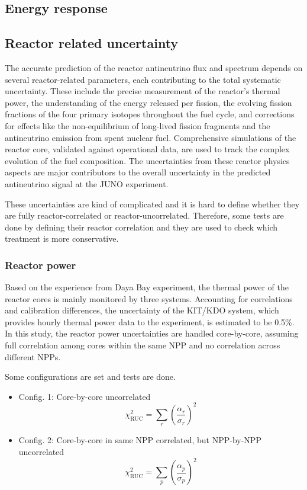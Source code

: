 \subsection{Energy response}
 

\subsection{Reactor related uncertainty}
The accurate prediction of the reactor antineutrino flux and spectrum depends on several reactor-related parameters, each contributing to the total systematic uncertainty. These include the precise measurement of the reactor's thermal power, the understanding of the energy released per fission, the evolving fission fractions of the four primary isotopes throughout the fuel cycle, and corrections for effects like the non-equilibrium of long-lived fission fragments and the antineutrino emission from spent nuclear fuel. Comprehensive simulations of the reactor core, validated against operational data, are used to track the complex evolution of the fuel composition. The uncertainties from these reactor physics aspects are major contributors to the overall uncertainty in the predicted antineutrino signal at the JUNO experiment.

These uncertainties are kind of complicated and it is hard to define whether they are fully reactor-correlated or reactor-uncorrelated. 
Therefore, some tests are done by defining their reactor correlation and they are used to check which treatment is more conservative. 

\subsubsection{Reactor power}
Based on the experience from Daya Bay experiment, the thermal power of the reactor cores is mainly monitored by three systems. Accounting for correlations and calibration differences, the uncertainty of the KIT/KDO system, which provides hourly thermal power data to the experiment, is estimated to be 0.5\%. 
In this study, the reactor power uncertainties are handled core-by-core, assuming full correlation among cores within the same NPP and no correlation across different NPPs.

Some configurations are set and tests are done. 
\begin{itemize}
        \item Config. 1: Core-by-core uncorrelated 
        \[
        \chi^2_{\text{RUC}} = \sum_{r} \left( \frac{\alpha_r}{\sigma_r} \right)^2
        \]
        \item Config. 2: Core-by-core in same NPP correlated, but NPP-by-NPP uncorrelated 
        \[
        \chi^2_{\text{RUC}} = \sum_{p} \left( \frac{\alpha_p}{\sigma_p} \right)^2 
        \]
    \end{itemize}
    
